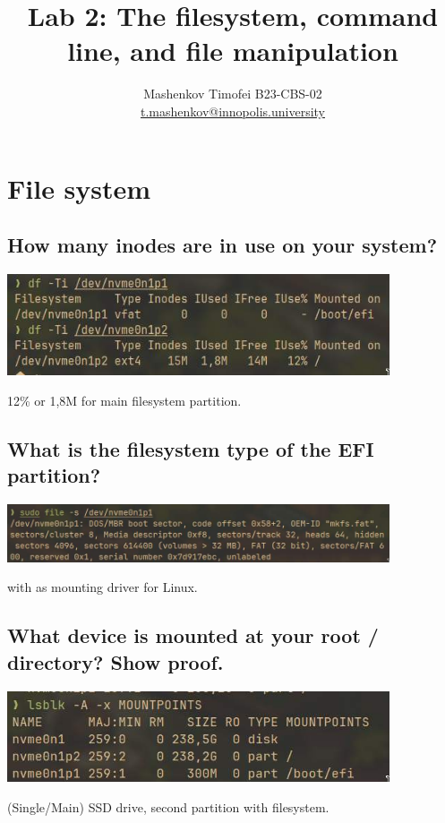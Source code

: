 \documentclass{article}
\title{Lab 2: The filesystem, command line, and file manipulation}
\author{Mashenkov Timofei B23-CBS-02 \\ \href{mailto:t.mashenkov@innopolis.university}{t.mashenkov@innopolis.university}}
\begin{document}
\maketitle{}

\section{File system}

\subsection{How many inodes are in use on your system?}
\noindent

\includegraphics[width=320pt]{1_2.jpg}

12\% or 1,8M for main filesystem partition.

\subsection{What is the filesystem type of the EFI partition?}
\noindent

\includegraphics[width=320pt]{efi.jpg}

 with  as mounting driver for Linux.

\subsection{What device is mounted at your root / directory? Show proof.}
\noindent

\includegraphics[width=320pt]{mount.jpg}

(Single/Main) SSD drive, second partition with filesystem.
\end{document}
